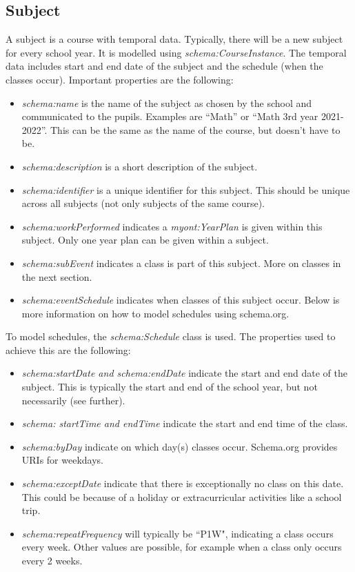 \documentclass[a4paper]{report}
\begin{document}
    \subsection{Subject}
    \label{subsubsection:subject}
    A subject is a course with temporal data. Typically, there will be a new subject for every school year. It is modelled using \textit{schema:CourseInstance}.
    The temporal data includes start and end date of the subject and the schedule (when the classes occur).
    Important properties are the following:
    \begin{itemize}
        \item \emph{schema:name} is the name of the subject as chosen by the school and communicated to the pupils. Examples are ``Math'' or ``Math 3rd year 2021-2022''. This can be the same as the name of the course, but doesn't have to be.
        \item \emph{schema:description} is a short description of the subject.
        \item \emph{schema:identifier} is a unique identifier for this subject. This should be unique across all subjects (not only subjects of the same course).
        \item \emph{schema:workPerformed} indicates a \textit{myont:YearPlan} is given within this subject. Only one year plan can be given within a subject.
        \item \emph{schema:subEvent} indicates a class is part of this subject. More on classes in the next section.
        \item \emph{schema:eventSchedule} indicates when classes of this subject occur. Below is more information on how to model schedules using schema.org. 
    \end{itemize}
    To model schedules, the \textit{schema:Schedule} class is used. The properties used to achieve this are the following:
    \begin{itemize}
        \item \emph{schema:startDate and schema:endDate} indicate the start and end date of the subject. This is typically the start and end of the school year, but not necessarily (see further).
        \item \emph{schema: startTime and endTime} indicate the start and end time of the class.
        \item \emph{schema:byDay} indicate on which day(s) classes occur. Schema.org provides URIs for weekdays.
        \item \emph{schema:exceptDate} indicate that there is exceptionally no class on this date. This could be because of a holiday or extracurricular activities like a school trip.
        \item \emph{schema:repeatFrequency} will typically be ``P1W", indicating a class occurs every week. Other values are possible, for example when a class only occurs every 2 weeks. 
    \end{itemize}
\end{document}

